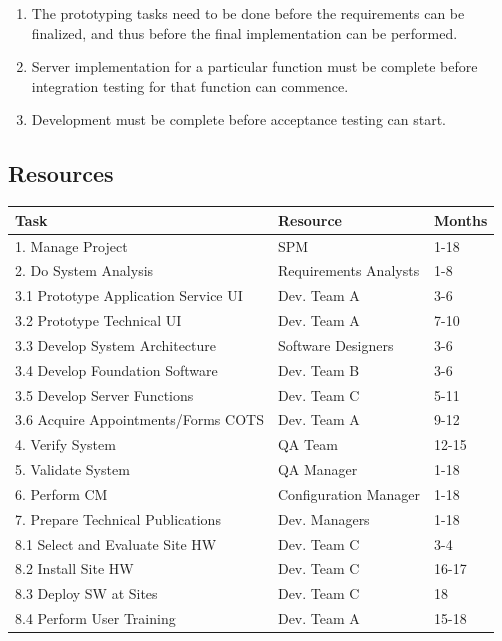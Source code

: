 \documentclass[11pt]{article}
\begin{document}
\begin{enumerate}
\item The prototyping tasks need to be done before the requirements can be finalized, and thus
  before the final implementation can be performed.
\item Server implementation for a particular function must be complete before integration testing
  for that function can commence.
\item Development must be complete before acceptance testing can start.
\end{enumerate}


\subsection{Resources}

\begin{center}
  \begin{tabular}{l@{\hspace{1cm}}|l|l}
    \bf Task                             & \bf Resource          & \bf Months \\
    \hline \hline
    1. Manage Project                    & SPM                   & 1-18       \\
    2. Do System Analysis                & Requirements Analysts & 1-8        \\
    3.1 Prototype Application Service UI & Dev. Team A           & 3-6        \\
    3.2 Prototype Technical UI           & Dev. Team A           & 7-10       \\
    3.3 Develop System Architecture      & Software Designers    & 3-6        \\
    3.4 Develop Foundation Software      & Dev. Team B           & 3-6        \\
    3.5 Develop Server Functions         & Dev. Team C           & 5-11       \\
    3.6 Acquire Appointments/Forms COTS  & Dev. Team A           & 9-12       \\
    4. Verify System                     & QA Team               & 12-15      \\
    5. Validate System                   & QA Manager            & 1-18       \\
    6. Perform CM                        & Configuration Manager & 1-18       \\
    7. Prepare Technical Publications    & Dev. Managers         & 1-18       \\
    8.1 Select and Evaluate Site HW      & Dev. Team C           & 3-4        \\
    8.2 Install Site HW                  & Dev. Team C           & 16-17      \\
    8.3 Deploy SW at Sites               & Dev. Team C           & 18         \\
    8.4 Perform User Training            & Dev. Team A           & 15-18      \\
  \end{tabular}
\end{center}
\end{document}
